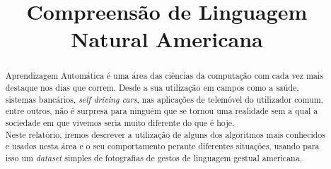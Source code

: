 \documentclass[conference]{IEEEtran}
\begin{document}
\title{Compreensão de Linguagem Natural Americana}

\author{
\and
{}
}

\maketitle

\begin{abstract}
Aprendizagem Automática é uma área das ciências da computação com cada vez mais destaque nos dias que correm. Desde a sua utilização em campos como a saúde, sistemas bancários, \textit{self driving cars}, nas aplicações de telemóvel do utilizador comum, entre outros, não é surpresa para ninguém que se tornou uma realidade sem a qual a sociedade em que vivemos seria muito diferente do que é hoje. \\
Neste relatório, iremos descrever a utilização de alguns dos algoritmos mais conhecidos e usados nesta área e o seu comportamento perante diferentes situações, usando para isso um \textit{dataset} simples de fotografias de gestos de linguagem gestual americana.
\end{abstract}












\end{document}

